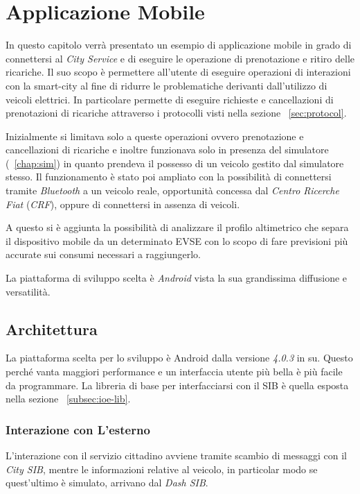\chapter{Applicazione Mobile}

In questo capitolo verrà presentato un esempio di applicazione mobile in grado di connettersi al \emph{City Service} e di eseguire le operazione di prenotazione e ritiro delle ricariche. Il suo scopo è permettere all'utente di eseguire operazioni di interazioni con la smart-city al fine di ridurre le problematiche derivanti dall'utilizzo di veicoli elettrici. In particolare permette di eseguire richieste e cancellazioni di prenotazioni di ricariche attraverso i protocolli visti nella sezione ~\ref{sec:protocol}.

Inizialmente si limitava solo a queste operazioni ovvero prenotazione e cancellazioni di ricariche e inoltre funzionava solo in presenza del simulatore (~\ref{chap:sim}) in quanto prendeva il possesso di un veicolo gestito dal simulatore stesso. Il funzionamento è stato poi ampliato con la possibilità di connettersi tramite \emph{Bluetooth} a un veicolo reale, opportunità concessa dal \emph{Centro Ricerche Fiat} (\emph{CRF}), oppure di connettersi in assenza di veicoli.

A questo si è aggiunta la possibilità di analizzare il profilo altimetrico che separa il dispositivo mobile da un determinato EVSE con lo scopo di fare previsioni più accurate sui consumi necessari a raggiungerlo.

La piattaforma di sviluppo scelta è \emph{Android} vista la sua grandissima diffusione e versatilità.

\section{Architettura}

La piattaforma scelta per lo sviluppo è Android dalla versione \emph{4.0.3} in su. Questo perché vanta maggiori performance e un interfaccia utente più bella è più facile da programmare. La libreria di base per interfacciarsi con il SIB è quella esposta nella sezione ~\ref{subsec:ioe-lib}.

\subsection{Interazione con L'esterno}

L'interazione con il servizio cittadino avviene tramite scambio di messaggi con il \emph{City SIB}, mentre le informazioni relative al veicolo, in particolar modo se quest'ultimo è simulato, arrivano dal \emph{Dash SIB}.


